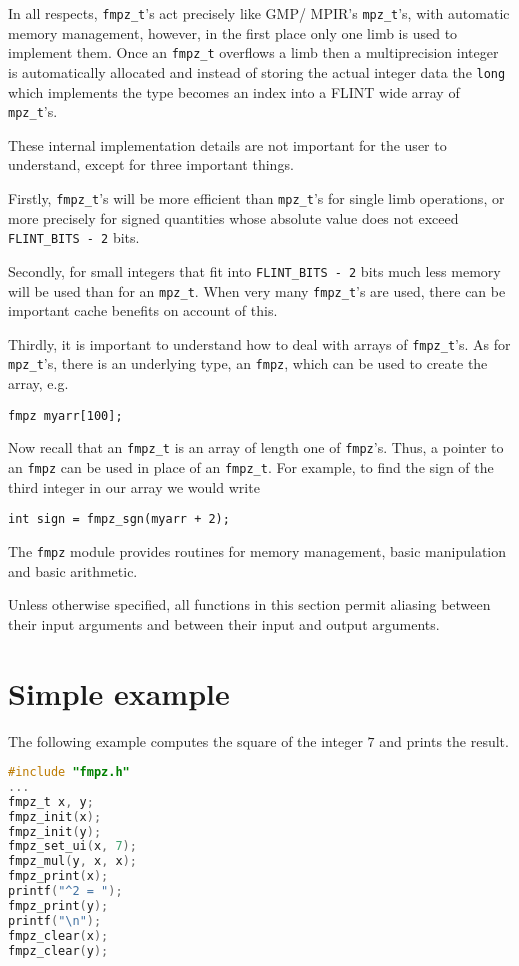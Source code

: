 \documentclass[a4paper,10pt]{book}
\newcommand{\code}{\lstinline}
\begin{document}
In all respects, \code{fmpz_t}'s act precisely like GMP/ MPIR's 
\code{mpz_t}'s, with automatic memory management, however, in the first 
place only one limb is used to implement them.  Once an \code{fmpz_t} 
overflows a limb then a multiprecision integer is automatically allocated 
and instead of storing the actual integer data the \code{long} which 
implements the type becomes an index into a FLINT wide array of 
\code{mpz_t}'s.

These internal implementation details are not important for the user to 
understand, except for three important things.

Firstly, \code{fmpz_t}'s will be more efficient than \code{mpz_t}'s for 
single limb operations, or more precisely for signed quantities whose 
absolute value does not exceed \code{FLINT_BITS - 2} bits.

Secondly, for small integers that fit into \code{FLINT_BITS - 2} bits 
much less memory will be used than for an \code{mpz_t}.  When very many 
\code{fmpz_t}'s are used, there can be important cache benefits on 
account of this.

Thirdly, it is important to understand how to deal with arrays of 
\code{fmpz_t}'s.  As for \code{mpz_t}'s, there is an underlying type, 
an \code{fmpz}, which can be used to create the array, e.g.\ 
\begin{lstlisting}
fmpz myarr[100];
\end{lstlisting}
Now recall that an \code{fmpz_t} is an array of length one of \code{fmpz}'s.
Thus, a pointer to an \code{fmpz} can be used in place of an \code{fmpz_t}.
For example, to find the sign of the third integer in our array we would 
write 
\begin{lstlisting}
int sign = fmpz_sgn(myarr + 2);
\end{lstlisting}

The \code{fmpz} module provides routines for memory management, basic 
manipulation and basic arithmetic.

Unless otherwise specified, all functions in this section permit aliasing 
between their input arguments and between their input and output 
arguments.

\section{Simple example}

The following example computes the square of the integer $7$ and prints 
the result.
\begin{lstlisting}[language=c]
#include "fmpz.h"
...
fmpz_t x, y;
fmpz_init(x);
fmpz_init(y);
fmpz_set_ui(x, 7);
fmpz_mul(y, x, x);
fmpz_print(x);
printf("^2 = ");
fmpz_print(y);
printf("\n");
fmpz_clear(x);
fmpz_clear(y);
\end{lstlisting}
\end{document}
